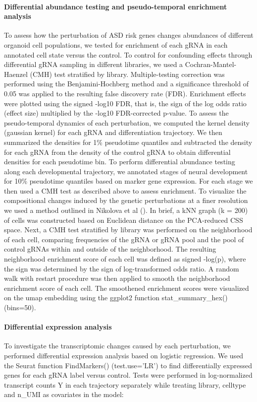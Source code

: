 \paragraph{Differential abundance testing and pseudo-temporal enrichment analysis}
To assess how the perturbation of ASD risk genes changes abundances of different organoid cell populations, we tested for enrichment of each gRNA in each annotated cell state versus the control. To control for confounding effects through differential gRNA sampling in different libraries, we used a Cochran-Mantel-Haenzel (CMH) test stratified by library. Multiple-testing correction was performed using the Benjamini-Hochberg method and a significance threshold of 0.05 was applied to the resulting false discovery rate (FDR). Enrichment effects were plotted using the signed -log10 FDR, that is, the sign of the log odds ratio (effect size) multiplied by the -log10 FDR-corrected p-value. To assess the pseudo-temporal dynamics of each perturbation, we computed the kernel density (gaussian kernel) for each gRNA and differentiation trajectory. We then summarized the densities for 1\% pseudotime quantiles and subtracted the density for each gRNA from the density of the control gRNA to obtain differential densities for each pseudotime bin. To perform differential abundance testing along each developmental trajectory, we annotated stages of neural development for 10\% pseudotime quantiles based on marker gene expression. For each stage we then used a CMH test as described above to assess enrichment. To visualize the compositional changes induced by the genetic perturbations at a finer resolution we used a method outlined in Nikolova et al (\cite{nikolova_fate_2022}). In brief, a kNN graph (k = 200) of cells was constructed based on Euclidean distance on the PCA-reduced CSS space. Next, a CMH test stratified by library was performed on the neighborhood of each cell, comparing frequencies of the gRNA or gRNA pool and the pool of control gRNAs within and outside of the neighborhood. The resulting neighborhood enrichment score of each cell was defined as signed -log(p), where the sign was determined by the sign of log-transformed odds ratio. A random walk with restart procedure was then applied to smooth the neighborhood enrichment score of each cell. The smoothened enrichment scores were visualized on the umap embedding using the ggplot2 function stat\_summary\_hex() (bins=50).

\paragraph{Differential expression analysis}
To investigate the transcriptomic changes caused by each perturbation, we performed differential expression analysis based on logistic regression. We used the Seurat function FindMarkers() (test.use='LR') to find differentially expressed genes for each gRNA label versus control. Tests were performed in log-normalized transcript counts Y in each trajectory separately while treating library, celltype and n\_UMI as covariates in the model:

